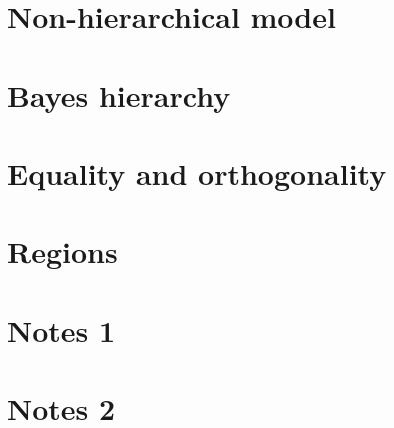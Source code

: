 \documentclass[preprint,12pt]{elsarticle}
\begin{document}
\section{Non-hierarchical model} \label{sec:Non_Hierarchical}


\section{Bayes hierarchy} \label{sec:Bayes_hierarchy}


\section{Equality and orthogonality} \label{sec:Eq_Orth}


\section{Regions} \label{sec:Regions}


\section{Notes 1} \label{sec:Notes_1}


\section{Notes 2} \label{sec:Notes_2}



 

\end{document}

